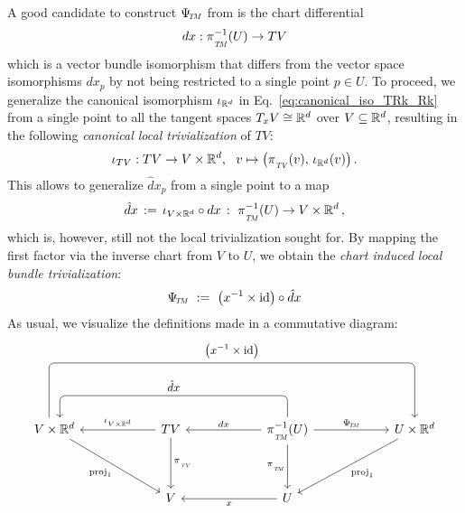 A good candidate to construct $\PsiTM$ from is the chart differential
\begin{align}
    dx: \piTM^{-1}(U) \to TV
\end{align}
which is a vector bundle isomorphism that differs from the vector space isomorphisms $dx_p$ by not being restricted to a single point $p \in U$.
To proceed, we generalize the canonical isomorphism $\iota_{\mathbb{R}^d}$ in Eq.~\eqref{eq:canonical_iso_TRk_Rk} from a single point to all the tangent spaces $T_xV \cong \mathbb{R}^d$ over $V \subseteq \mathbb{R}^d$, resulting in the following \emph{canonical local trivialization} of $TV$:
\begin{align}
    \iota_{TV}: TV \to V\times\R^d,\ \ v \mapsto \big( \piTV(v),\, \iota_{\R^d}(v) \big) \,.
\end{align}
This allows to generalize $\hat{d}x_p$ from a single point to a map
\begin{align}
    \hat{d}x\, :=\, \iota_{V\times\R^d} \circ dx \,:\ \piTM^{-1}(U) \to V \times \R^d \,,
\end{align}
which is, however, still not the local trivialization sought for.
By mapping the first factor via the inverse chart from $V$ to $U$, we obtain the \emph{chart induced local bundle trivialization}:
\begin{align}
    \PsiTM\ :=\ \big(x^{-1} \times \id \big) \circ \hat{d}x
\end{align}
As usual, we visualize the definitions made in a commutative diagram:
\begin{equation}\label{cd:coordinate_basis_bundle_trivialization}
    \begin{tikzcd}[row sep=3.5em, column sep=6em]
        V \times \R^d
            \arrow[rrr, rounded corners, to path={ 
                    ([xshift=-1ex]\tikztostart.north)
                    |- node[above, pos=.75]{\small$\big( x^{-1} \times \id \big)$} ([yshift=10ex]\tikztotarget.north)
                    -- (\tikztotarget.north)
                    }]
            \arrow[dr, "\proj_1"']
        &
        TV  \arrow[d, "\piTV"]
            \arrow[l, "\iota_{V \times \R^d}"']
        &
        \piTM^{-1}(U)
            \arrow[d, "\piTM"']
            \arrow[r, "\PsiTM"]
            \arrow[l, "dx"']
            \arrow[ll, rounded corners, to path={ 
                    |- node[above, pos=.75]{\small$\hat{d}x$} ([yshift=4ex, xshift=1ex]\tikztotarget.north)
                    -- ([xshift=1ex]\tikztotarget.north)
                    }]
        &
        U \times \R^d
            \arrow[ld, "\proj_1"]
        \\
        &
        V
        &
        U
            \arrow[l, "x"]
    \end{tikzcd}
\end{equation}


